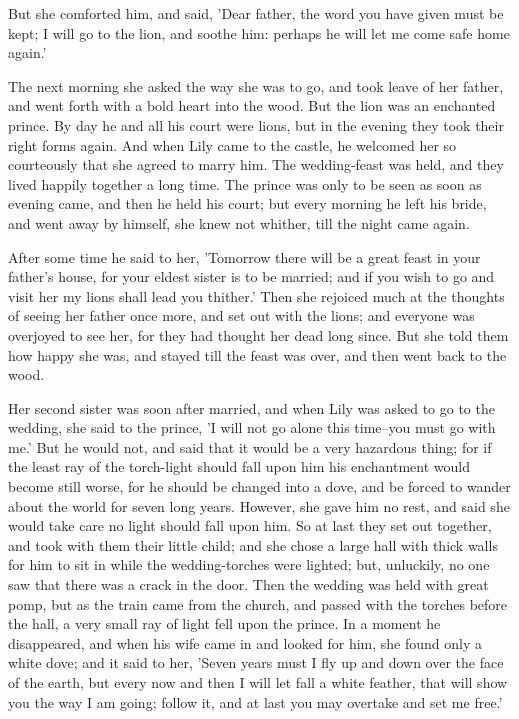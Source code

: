 \documentclass[12pt]{book}
\begin{document}
But she comforted him, and said, 'Dear father, the word you have given
must be kept; I will go to the lion, and soothe him: perhaps he will
let me come safe home again.'

The next morning she asked the way she was to go, and took leave of
her father, and went forth with a bold heart into the wood. But the
lion was an enchanted prince. By day he and all his court were lions,
but in the evening they took their right forms again. And when Lily
came to the castle, he welcomed her so courteously that she agreed to
marry him. The wedding-feast was held, and they lived happily together
a long time. The prince was only to be seen as soon as evening came,
and then he held his court; but every morning he left his bride, and
went away by himself, she knew not whither, till the night came again.

After some time he said to her, 'Tomorrow there will be a great feast
in your father's house, for your eldest sister is to be married; and
if you wish to go and visit her my lions shall lead you thither.' Then
she rejoiced much at the thoughts of seeing her father once more, and
set out with the lions; and everyone was overjoyed to see her, for
they had thought her dead long since. But she told them how happy she
was, and stayed till the feast was over, and then went back to the
wood.

Her second sister was soon after married, and when Lily was asked to
go to the wedding, she said to the prince, 'I will not go alone this
time--you must go with me.' But he would not, and said that it would
be a very hazardous thing; for if the least ray of the torch-light
should fall upon him his enchantment would become still worse, for he
should be changed into a dove, and be forced to wander about the world
for seven long years. However, she gave him no rest, and said she
would take care no light should fall upon him. So at last they set out
together, and took with them their little child; and she chose a large
hall with thick walls for him to sit in while the wedding-torches were
lighted; but, unluckily, no one saw that there was a crack in the
door. Then the wedding was held with great pomp, but as the train came
from the church, and passed with the torches before the hall, a very
small ray of light fell upon the prince. In a moment he disappeared,
and when his wife came in and looked for him, she found only a white
dove; and it said to her, 'Seven years must I fly up and down over the
face of the earth, but every now and then I will let fall a white
feather, that will show you the way I am going; follow it, and at last
you may overtake and set me free.'
\end{document}

